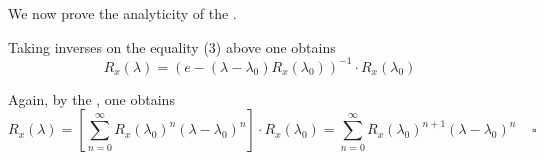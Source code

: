 \documentclass[12pt]{article}
\begin{document}
We now prove the analyticity of the .

Taking inverses on the equality (3) above one obtains
\begin{displaymath}
R_x(\lambda) = (e-(\lambda-\lambda_0)R_x(\lambda_0))^{-1} \cdot R_x(\lambda_0)
\end{displaymath}

Again, by the , one obtains
\begin{displaymath}
R_x(\lambda) = \left[ \sum_{n=0}^{\infty} R_x(\lambda_0)^{n}(\lambda -\lambda_0)^n \right]\cdot R_x(\lambda_0) =
\sum_{n=0}^{\infty} R_x(\lambda_0)^{n+1}(\lambda -\lambda_0)^n  \;\;\;\;\square
\end{displaymath}
\end{document}
